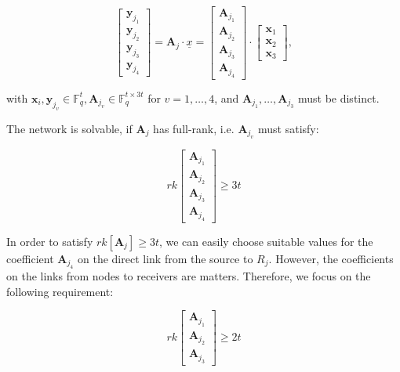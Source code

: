 \[
\left[\begin{array}{c}
\boldsymbol{y}_{j_{1}}\\
\boldsymbol{y}_{j_{2}}\\
\boldsymbol{y}_{j_{3}}\\
\boldsymbol{y}_{j_{4}}
\end{array}\right]=\boldsymbol{A}_{j}\cdot\underline{x}=\left[\begin{array}{c}
\boldsymbol{A}_{j_{1}}\\
\boldsymbol{A}_{j_{2}}\\
\boldsymbol{A}_{j_{3}}\\
\boldsymbol{A}_{j_{4}}
\end{array}\right]\cdot\left[\begin{array}{c}
\boldsymbol{x}_{1}\\
\boldsymbol{x}_{2}\\
\boldsymbol{x}_{3}
\end{array}\right],
\]

with $\boldsymbol{x}_{i},\boldsymbol{y}_{j_{v}}\in\ensuremath{\mathbb{F}}_{q}^{t},\boldsymbol{A}_{j_{v}}\in\ensuremath{\mathbb{F}}_{q}^{t\times3t}$
for $v=1,\ldots,4$, and $\boldsymbol{A}_{j_{1}},\ldots,\boldsymbol{A}_{j_{3}}$
must be distinct.

The network is solvable, if $\boldsymbol{A}_{j}$ has full-rank, i.e.
$\boldsymbol{A}_{j_{v}}$ must satisfy:

\[
rk\left[\begin{array}{c}
\boldsymbol{A}_{j_{1}}\\
\boldsymbol{A}_{j_{2}}\\
\boldsymbol{A}_{j_{3}}\\
\boldsymbol{A}_{j_{4}}
\end{array}\right]\geq3t
\]

In order to satisfy $rk\left[\boldsymbol{A}_{j}\right]\geq3t$, we
can easily choose suitable values for the coefficient $\boldsymbol{A}_{j_{4}}$
on the direct link from the source to $R_{j}$. However, the coefficients
on the links from nodes to receivers are matters. Therefore, we focus
on the following requirement:

\begin{equation}
rk\left[\begin{array}{c}
\boldsymbol{A}_{j_{1}}\\
\boldsymbol{A}_{j_{2}}\\
\boldsymbol{A}_{j_{3}}
\end{array}\right]\geq2t\label{eq:rk_rqm_e1l1h3s4}
\end{equation}

